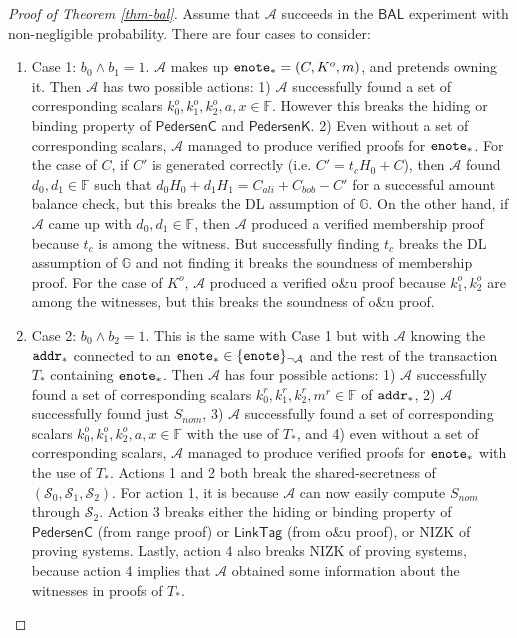 \documentclass{article}
\theoremstyle{plain}
\theoremstyle{remark}
\begin{document}
\begin{proof}[Proof of Theorem \ref{thm-bal}]
Assume that $\mathcal{A}$ succeeds in the $\textsf{BAL}$ experiment with non-negligible probability. There are four cases to consider:
\begin{enumerate}
\item Case 1: $b_0 \wedge b_1 = 1$. $\mathcal{A}$ makes up ${\tt enote}_*=(C,K^o,m)$, and pretends owning it. Then $\mathcal{A}$ has two possible actions: 1) $\mathcal{A}$ successfully found a set of corresponding scalars $k_0^o, k_1^o, k_2^o, a, x \in\mathbb{F}$. However this breaks the hiding or binding property of $\textsf{PedersenC}$ and $\textsf{PedersenK}$. 2) Even without a set of corresponding scalars, $\mathcal{A}$ managed to produce verified proofs for ${\tt enote}_*$. For the case of $C$, if $C'$ is generated correctly (i.e. $C' = t_c H_0 + C$), then $\mathcal{A}$ found $d_0, d_1 \in\mathbb{F}$ such that $ d_0 H_0 + d_1 H_1 = C_{ali} + C_{bob} - C'$ for a successful amount balance check, but this breaks the DL assumption of $\mathbb{G}$. On the other hand, if $\mathcal{A}$ came up with $d_0, d_1 \in\mathbb{F}$, then $\mathcal{A}$ produced a verified membership proof because $t_c$ is among the witness. But successfully finding $t_c$ breaks the DL assumption of $\mathbb{G}$ and not finding it breaks the soundness of membership proof. For the case of $K^o$, $\mathcal{A}$ produced a verified o\&u proof because $k_1^o, k_2^o$ are among the witnesses, but this breaks the soundness of o\&u proof.
\item Case 2: $b_0 \wedge b_2 = 1$. This is the same with Case 1 but with $\mathcal{A}$ knowing the ${\tt addr}_*$ connected to an ${\tt enote}_* \in\{{\tt enote}\}_{\neg\mathcal{A}}$ and the rest of the transaction $T_*$ containing ${\tt enote}_*$. Then $\mathcal{A}$ has four possible actions: 1) $\mathcal{A}$ successfully found a set of corresponding scalars $k_0^r, k_1^r, k_2^r, m^r \in\mathbb{F}$ of ${\tt addr}_*$, 2) $\mathcal{A}$ successfully found just $S_{nom}$, 3) $\mathcal{A}$ successfully found a set of corresponding scalars $k_0^o, k_1^o, k_2^o, a, x \in\mathbb{F}$ with the use of $T_*$, and 4) even without a set of corresponding scalars, $\mathcal{A}$ managed to produce verified proofs for ${\tt enote}_*$ with the use of $T_*$. Actions 1 and 2 both break the shared-secretness of $(\mathcal{S}_0, \mathcal{S}_1, \mathcal{S}_2)$. For action 1, it is because $\mathcal{A}$ can now easily compute $S_{nom}$ through $\mathcal{S}_2$. Action 3 breaks either the hiding or binding property of $\textsf{PedersenC}$ (from range proof) or $\textsf{LinkTag}$ (from o\&u proof), or NIZK of proving systems. Lastly, action 4 also breaks NIZK of proving systems, because action 4 implies that $\mathcal{A}$ obtained some information about the witnesses in proofs of $T_*$.

\end{enumerate}
\end{proof}
\end{document}
